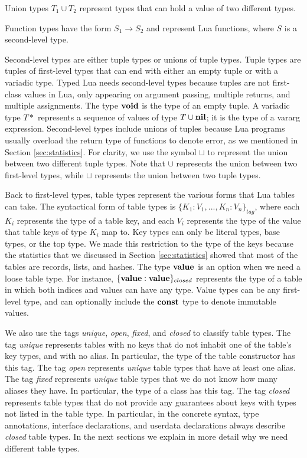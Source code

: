 Union types $T_{1} \cup T_{2}$ represent types that can hold a value
of two different types.

Function types have the form $S_{1} \rightarrow S_{2}$ and represent Lua functions,
where $S$ is a second-level type.

Second-level types are either tuple types or unions of tuple types.
Tuple types are tuples of first-level types that can end with
either an empty tuple or with a variadic type.
Typed Lua needs second-level types because tuples are not first-class
values in Lua, only appearing on argument passing, multiple returns,
and multiple assignments.
The type $\mathbf{void}$ is the type of an empty tuple.
A variadic type $T{*}$ represents a sequence of values of type $T \cup \mathbf{nil}$;
it is the type of a vararg expression.
Second-level types include unions of tuples because Lua programs
usually overload the return type of functions to denote error,
as we mentioned in Section \ref{sec:statistics}.
For clarity, we use the symbol $\sqcup$ to represent the union between
two different tuple types.
Note that $\cup$ represents the union between two first-level types,
while $\sqcup$ represents the union between two tuple types.

Back to first-level types, table types represent the various forms
that Lua tables can take.
The syntactical form of table types is $\{ K_{1}{:}V_{1}, ..., K_{n}{:}V_{n} \}_{tag}$,
where each $K_{i}$ represents the type of a table key,
and each $V_{i}$ represents the type of the value that table keys of type $K_{i}$ map to.
Key types can only be literal types, base types, or the top type.
We made this restriction to the type of the keys because the statistics
that we discussed in Section \ref{sec:statistics} showed that most
of the tables are records, lists, and hashes.
The type $\mathbf{value}$ is an option when we need a loose table type.
For instance, $\{\mathbf{value}:\mathbf{value}\}_{closed}$ represents the type of a
table in which both indices and values can have any type.
Value types can be any first-level type, and can optionally include
the $\mathbf{const}$ type to denote immutable values.

We also use the tags \emph{unique}, \emph{open}, \emph{fixed}, and \emph{closed}
to classify table types.
The tag \emph{unique} represents tables with no keys that do not
inhabit one of the table's key types, and with no alias.
In particular, the type of the table constructor has this tag.
The tag \emph{open} represents \emph{unique} table types that
have at least one alias.
The tag \emph{fixed} represents \emph{unique} table types that we
do not know how many aliases they have.
In particular, the type of a class has this tag.
The tag \emph{closed} represents table types that do not provide
any guarantees about keys with types not listed in the table type.
In particular, in the concrete syntax, type annotations, interface
declarations, and userdata declarations always describe \emph{closed} table types.
In the next sections we explain in more detail why we need
different table types.

